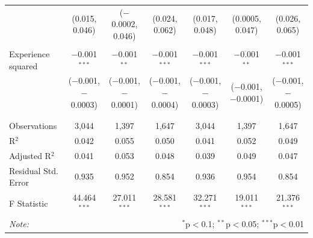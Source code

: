 \documentclass[alpha-refs]{wiley-article-01g}
\begin{document}
\begin{landscape}
\begin{table}[!htbp]
\begin{tabular}{@{\extracolsep{5pt}}lcccccc}
  & (0.015, 0.046) & ($-$0.0002, 0.046) & (0.024, 0.062) & (0.017, 0.048) & (0.0005, 0.047) & (0.026, 0.065) \\ 
  & & & & & & \\ 
 Experience squared & $-$0.001$^{***}$ & $-$0.001$^{**}$ & $-$0.001$^{***}$ & $-$0.001$^{***}$ & $-$0.001$^{**}$ & $-$0.001$^{***}$ \\ 
  & ($-$0.001, $-$0.0003) & ($-$0.001, $-$0.0001) & ($-$0.001, $-$0.0004) & ($-$0.001, $-$0.0003) & ($-$0.001, $-$0.0001) & ($-$0.001, $-$0.0005) \\ 
  & & & & & & \\ 
\hline \\[-.8ex] 
Observations & 3,044 & 1,397 & 1,647 & 3,044 & 1,397 & 1,647 \\ 
R$^{2}$ & 0.042 & 0.055 & 0.050 & 0.041 & 0.052 & 0.049 \\ 
Adjusted R$^{2}$ & 0.041 & 0.053 & 0.048 & 0.039 & 0.049 & 0.047 \\ 
Residual Std. Error & 0.935 & 0.952 & 0.854 & 0.936 & 0.954 & 0.854 \\ 
F Statistic & 44.464$^{***}$ & 27.011$^{***}$ & 28.581$^{***}$ & 32.271$^{***}$ & 19.011$^{***}$ & 21.376$^{***}$ \\ 
\hline 
\textit{Note:}  & \multicolumn{6}{r}{$^{*}$p$<$0.1; $^{**}$p$<$0.05; $^{***}$p$<$0.01} \\ 
\end{tabular} 
\end{table} 

\end{landscape}

\newpage
\end{document}

